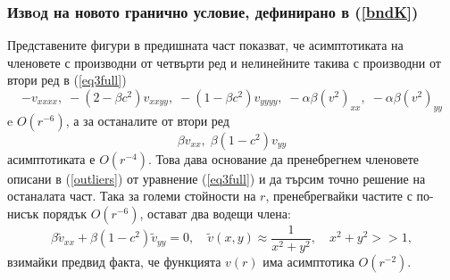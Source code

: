 \documentclass[a4paper]{article}
\newcommand{\be}{\begin{equation}}
\newcommand{\ee}{\end{equation}}
\newcommand{\rf}[1]{(\ref{#1})}
\theoremstyle{remark}
\begin{document}
\begin{large}
\subsubsection{Извoд на новото гранично условие, дефинирано в \rf{bndK} }
Представените фигури в предишната част показват, че асимптотиката на членовете с производни от четвърти ред и нелинейните такива с производни от втори ред в \rf{eq3full}
\be\label{outliers}
- v_{xxxx}, \;  - (2-\beta c^2)v_{xxyy},  \;  - (1-\beta c^2)v_{yyyy}, \;  - \alpha \beta (v^2)_{xx}, \; - \alpha \beta (v^2)_{yy}
\ee
e $O(r^{-6})$, а за останалите от втори ред
$$
\beta v_{xx}, \; \beta (1-c^2) v_{yy}
$$
асимптотиката е $O(r^{-4})$. Това дава основание да пренебрегнем членовете описани в \rf{outliers} от уравнение \rf{eq3full} и да търсим точно решение на останалата част. Така за големи стойности на $r$, пренебрегвайки частите с по-нисък порядък $O(r^{-6})$, остават два водещи члена:
\be\label{asymptEq}
\beta \tilde v_{xx} + \beta (1-c^2) \tilde v_{yy} =0, \quad \tilde v(x,y) \approx \frac{1}{x^2 + y^2}, \quad x^2 + y^2 >>1,
\ee
взимайки предвид факта, че функцията $v(r)$ има асимптотика $O(r^{-2})$.


\end{large}
\end{document}
